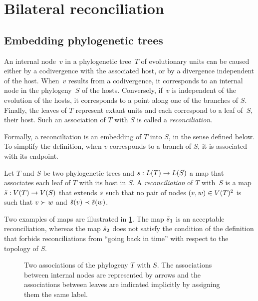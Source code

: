 \section{Bilateral reconciliation}\label{sec:reconciliation:bilateral}

\subsection{Embedding phylogenetic trees}

An internal node~\(v\) in a phylogenetic tree~\(T\) of evolutionary units can be caused either by a codivergence with the associated host, or by a divergence independent of the host.
When~\(v\) results from a codivergence, it corresponds to an internal node in the phylogeny~\(S\) of the hosts.
Conversely, if~\(v\) is independent of the evolution of the hosts, it corresponds to a point along one of the branches of \(S\).
Finally, the leaves of \(T\) represent extant units and each correspond to a leaf of~\(S\), their host.
Such an association of \(T\) with \(S\) is called a \emph{reconciliation}.

Formally, a reconciliation is an embedding of \(T\) into \(S\), in the sense defined below.
To simplify the definition, when \(v\) corresponds to a branch of \(S\), it is associated with its endpoint.

\begin{definition}[Reconciliations]\label{definition:rec}
    Let \(T\) and \(S\) be two phylogenetic trees and \(s : L(T) \rightarrow L(S)\) a map that associates each leaf of \(T\) with its host in \(S\).
    A \emph{reconciliation} of \(T\) with~\(S\) is a map \(\tilde{s} : V(T) \rightarrow V(S)\) that extends \(s\) such that no pair of nodes \((v, w) \in V(T)^2\) is such that \(v \succ w\) and \(\tilde{s}(v) \prec \tilde{s}(w)\).
\end{definition}

Two examples of maps are illustrated in \cref{fig:reconciliation:strict-rec}.
The map \(\tilde{s}_1\) is an acceptable reconciliation, whereas the map \(\tilde{s}_2\) does not satisfy the condition of the definition that forbids reconciliations from \enquote{going back in time} with respect to the topology of \(S\).

\begin{figure}[htb]
    \capstart
    \centering
    
    \caption[Two examples of strict reconciliations]{
        Two associations of the phylogeny \(T\) with \(S\).
        The associations between internal nodes are represented by arrows and the associations between leaves are indicated implicitly by assigning them the same label.
    }
    \label{fig:reconciliation:strict-rec}
\end{figure}

